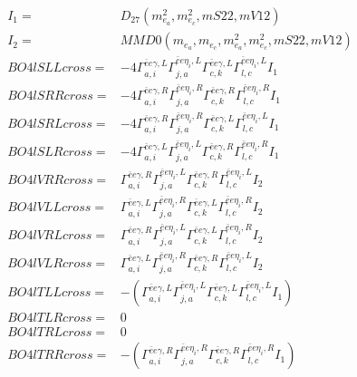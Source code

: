 \documentclass[A4,landscape]{article}
\begin{document}
\begin{align} 
I_1 = & D_{27}(m^2_{e_{{a}}}, m^2_{e_{{c}}}, mS22, mV12) \\ 
I_2 = & MMD0(m_{e_{{a}}}, m_{e_{{c}}}, m^2_{e_{{a}}}, m^2_{e_{{c}}}, mS22, mV12) \\ 
  BO4lSLLcross= & -4  \Gamma^{\bar{e}e \gamma ,L}_{a, i} \Gamma^{\bar{e}e \eta_i ,L}_{j, a} \Gamma^{\bar{e}e \gamma ,L}_{c, k} \Gamma^{\bar{e}e \eta_i ,L}_{l, c} I_1 \\ 
  BO4lSRRcross= & -4  \Gamma^{\bar{e}e \gamma ,R}_{a, i} \Gamma^{\bar{e}e \eta_i ,R}_{j, a} \Gamma^{\bar{e}e \gamma ,R}_{c, k} \Gamma^{\bar{e}e \eta_i ,R}_{l, c} I_1 \\ 
  BO4lSRLcross= & -4  \Gamma^{\bar{e}e \gamma ,R}_{a, i} \Gamma^{\bar{e}e \eta_i ,R}_{j, a} \Gamma^{\bar{e}e \gamma ,L}_{c, k} \Gamma^{\bar{e}e \eta_i ,L}_{l, c} I_1 \\ 
  BO4lSLRcross= & -4  \Gamma^{\bar{e}e \gamma ,L}_{a, i} \Gamma^{\bar{e}e \eta_i ,L}_{j, a} \Gamma^{\bar{e}e \gamma ,R}_{c, k} \Gamma^{\bar{e}e \eta_i ,R}_{l, c} I_1 \\ 
  BO4lVRRcross= &  \Gamma^{\bar{e}e \gamma ,R}_{a, i} \Gamma^{\bar{e}e \eta_i ,L}_{j, a} \Gamma^{\bar{e}e \gamma ,R}_{c, k} \Gamma^{\bar{e}e \eta_i ,L}_{l, c} I_2 \\ 
  BO4lVLLcross= &  \Gamma^{\bar{e}e \gamma ,L}_{a, i} \Gamma^{\bar{e}e \eta_i ,R}_{j, a} \Gamma^{\bar{e}e \gamma ,L}_{c, k} \Gamma^{\bar{e}e \eta_i ,R}_{l, c} I_2 \\ 
  BO4lVRLcross= &  \Gamma^{\bar{e}e \gamma ,R}_{a, i} \Gamma^{\bar{e}e \eta_i ,L}_{j, a} \Gamma^{\bar{e}e \gamma ,L}_{c, k} \Gamma^{\bar{e}e \eta_i ,R}_{l, c} I_2 \\ 
  BO4lVLRcross= &  \Gamma^{\bar{e}e \gamma ,L}_{a, i} \Gamma^{\bar{e}e \eta_i ,R}_{j, a} \Gamma^{\bar{e}e \gamma ,R}_{c, k} \Gamma^{\bar{e}e \eta_i ,L}_{l, c} I_2 \\ 
  BO4lTLLcross= & -( \Gamma^{\bar{e}e \gamma ,L}_{a, i} \Gamma^{\bar{e}e \eta_i ,L}_{j, a} \Gamma^{\bar{e}e \gamma ,L}_{c, k} \Gamma^{\bar{e}e \eta_i ,L}_{l, c} I_1) \\ 
  BO4lTLRcross= & 0 \\ 
  BO4lTRLcross= & 0 \\ 
  BO4lTRRcross= & -( \Gamma^{\bar{e}e \gamma ,R}_{a, i} \Gamma^{\bar{e}e \eta_i ,R}_{j, a} \Gamma^{\bar{e}e \gamma ,R}_{c, k} \Gamma^{\bar{e}e \eta_i ,R}_{l, c} I_1) \\ 
\end{align} 
\end{document}
